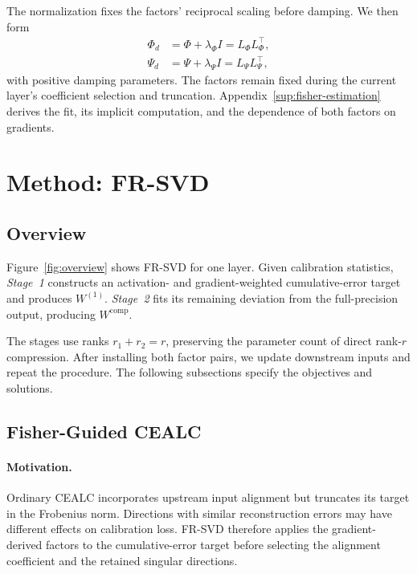 \documentclass[11pt]{article}
\begin{document}
The normalization fixes the factors' reciprocal scaling before damping. We then form
\begin{equation}
\begin{aligned}
\Phi_d&=\Phi+\lambda_\Phi I=L_\Phi L_\Phi^\top,\\
\Psi_d&=\Psi+\lambda_\Psi I=L_\Psi L_\Psi^\top,
\end{aligned}
\label{eq:fisher-cholesky}
\end{equation}
with positive damping parameters. The factors remain fixed during the current layer's coefficient selection and truncation. Appendix~\ref{sup:fisher-estimation} derives the fit, its implicit computation, and the dependence of both factors on gradients.

\section{Method: FR-SVD}\label{sec:method}

\subsection{Overview}\label{sec:overview}

Figure~\ref{fig:overview} shows FR-SVD for one layer. Given calibration statistics, \emph{Stage~1} constructs an activation- and gradient-weighted cumulative-error target and produces $W^{(1)}$. \emph{Stage~2} fits its remaining deviation from the full-precision output, producing $W^{\mathrm{comp}}$.



The stages use ranks $r_1+r_2=r$, preserving the parameter count of direct rank-$r$ compression. After installing both factor pairs, we update downstream inputs and repeat the procedure. The following subsections specify the objectives and solutions.

\subsection{Fisher-Guided CEALC}\label{sec:fisher-cealc}

\paragraph{Motivation.}
Ordinary CEALC incorporates upstream input alignment but truncates its target in the Frobenius norm. Directions with similar reconstruction errors may have different effects on calibration loss. FR-SVD therefore applies the gradient-derived factors to the cumulative-error target before selecting the alignment coefficient and the retained singular directions.
\end{document}
